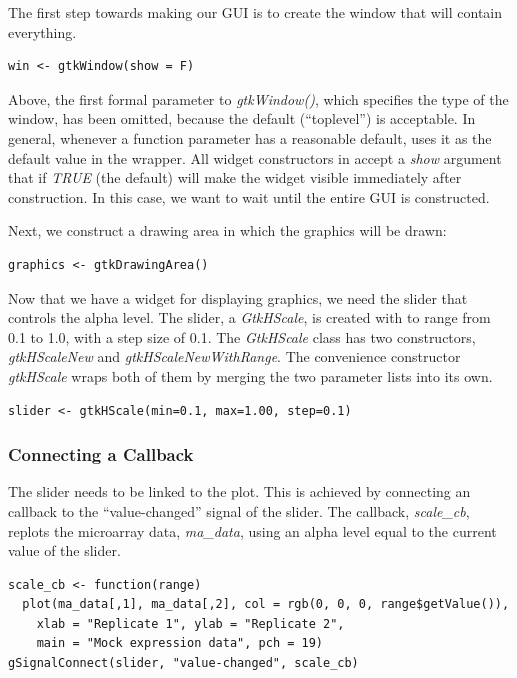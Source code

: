 \documentclass[article]{jss}
\begin{document}
The first step towards making our GUI is to create the window that
will contain everything. 
\begin{verbatim}
win <- gtkWindow(show = F)
\end{verbatim}

Above, the first formal parameter to \emph{gtkWindow()}, which specifies the
type of the window, has been omitted, because the default (``toplevel'') is acceptable.  
In general, whenever a function parameter
has a reasonable default,  uses it as the default value in the
 wrapper. All widget constructors
in  accept a \emph{show} argument that if \emph{TRUE} (the default)
will make the widget visible immediately after construction.
In this case, we want to wait until the entire GUI is constructed. 

Next, we construct a drawing area in which the  graphics will be
drawn:
\begin{verbatim}
graphics <- gtkDrawingArea()
\end{verbatim}

Now that we have a widget for displaying  graphics, we need the slider
that controls the alpha level. The slider, a \emph{GtkHScale}, is created
with to range from 0.1 to 1.0, with a step size of 0.1. The \emph{GtkHScale}
class has two constructors, \emph{gtkHScaleNew} and \emph{gtkHScaleNewWithRange}.
The convenience constructor \emph{gtkHScale} wraps both of them by
merging the two parameter lists into its own.
\begin{verbatim}
slider <- gtkHScale(min=0.1, max=1.00, step=0.1)
\end{verbatim}

\subsubsection{Connecting a Callback}

The slider needs to be linked to the plot. This is achieved by connecting
an  callback to the ``value-changed'' signal of the slider. The callback,
\emph{scale\_cb}, replots the microarray data, \emph{ma\_data}, using
an alpha level equal to the current value of the slider. 
\begin{verbatim}
scale_cb <- function(range) 
  plot(ma_data[,1], ma_data[,2], col = rgb(0, 0, 0, range$getValue()),
    xlab = "Replicate 1", ylab = "Replicate 2", 
    main = "Mock expression data", pch = 19)
gSignalConnect(slider, "value-changed", scale_cb)
\end{verbatim}
\end{document}
